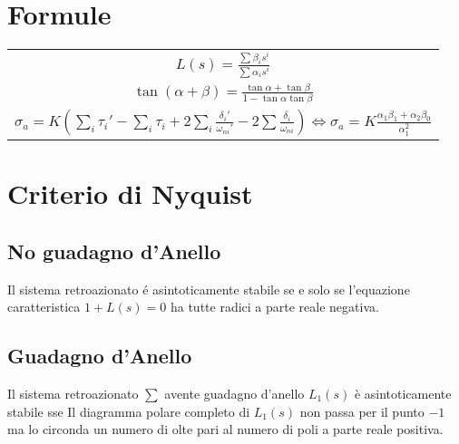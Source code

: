 \documentclass{article}
\begin{document}
    \section{Formule}

    \begin{minipage}{0.5\textwidth}
    \begin{tabular}{c}
    ${\displaystyle L(s) = \frac{\sum \beta_i s^i}{\sum \alpha_i s^i} }$\\
    ${\displaystyle \tan(\alpha + \beta) = \frac{\tan \alpha + \tan \beta}{1 - \tan \alpha \tan \beta} }$\\
    ${\displaystyle \sigma_a = K\left(\sum_i \tau_i' - \sum_i\tau_i + 2\sum_i\frac{\delta_i'}{\omega_{ni}'}-2\sum\frac{\delta_i}{\omega_{ni}}\right) \Leftrightarrow \sigma_a =  K\frac{\alpha_1\beta_1 + \alpha_2\beta_0}{\alpha_1^2}}$
    \end{tabular}

    \end{minipage}


\newpage
    \section{Criterio di Nyquist}
    \subsection{No guadagno d'Anello}
    Il sistema retroazionato \'e asintoticamente stabile se e solo se l'equazione caratteristica $1+L(s) = 0$ ha tutte radici a parte reale negativa.

    \subsection{Guadagno d'Anello}
    Il sistema retroazionato $\sum$ avente guadagno d'anello $L_1(s)$ \`e asintoticamente stabile sse Il diagramma polare completo di $L_1(s)$ non passa per il punto $-1$ ma lo circonda un numero di olte pari al numero di poli a parte reale positiva.
\end{document}
